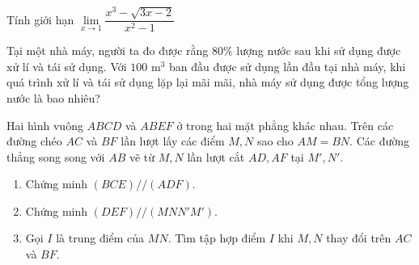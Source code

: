 \begin{ex}%
Tính giới hạn  $\lim\limits_{x\to 1}\dfrac{x^3-\sqrt{3x-2}}{x^2-1}$
\end{ex}

\begin{ex}%
Tại một nhà máy, người ta đo được rằng $80\%$ lượng nước sau khi sử dụng được xử lí và tái sử dụng. Với $100$ m$^3$ ban đầu được sử dụng lần đầu tại nhà máy, khi quá trình xử lí và tái sử dụng lặp lại mãi mãi, nhà máy sử dụng được tổng lượng nước là bao nhiêu?
\end{ex}

\begin{ex} %
Hai hình vuông $ABCD$ và $ABEF$ ở trong hai mặt phẳng khác nhau. Trên các đường chéo $AC$ và $BF$ lần lượt lấy các điểm $M,N$ sao cho $AM=BN$. Các đường thẳng song song với $AB$ vẽ từ $M,N$ lần lượt cắt $AD,AF$ tại ${M}',{N}'$.
\begin{enumerate}
    \item Chứng minh $\left( BCE \right)\text{//}\left( ADF \right)$.
    \item Chứng minh $\left( DEF \right)\text{//}\left( MN{N}'{M}' \right)$. 
    \item Gọi $I$ là trung điểm của $MN$. Tìm tập hợp điểm $I$ khi $M,N$ thay đổi trên $AC$ và $BF$. 
\end{enumerate}

\end{ex}
